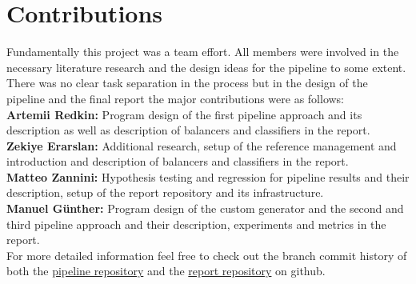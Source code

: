\section{Contributions}

Fundamentally this project was a team effort. All members were involved in the necessary literature research and the design ideas for the pipeline to some extent.
There was no clear task separation in the process but in the design of the pipeline and the final report the major contributions were as follows:\\

\textbf{Artemii Redkin:} Program design of the first pipeline approach and its description as well as description of balancers and classifiers in the report.\\

\textbf{Zekiye Erarslan:} Additional research, setup of the reference management and introduction and description of balancers and classifiers in the report.\\

\textbf{Matteo Zannini:} Hypothesis testing and regression for pipeline results and their description, setup of the report repository and its infrastructure.\\

\textbf{Manuel Günther:} Program design of the custom generator and the second and third pipeline approach and their description, experiments and metrics in the report.\\

For more detailed information feel free to check out the branch commit history of both the \href{https://github.com/gnthr-solve/TP_ML_Pipeline}{pipeline repository}
and the \href{https://github.com/gnthr-solve/TP_ML_PL_report}{report repository} on github.
